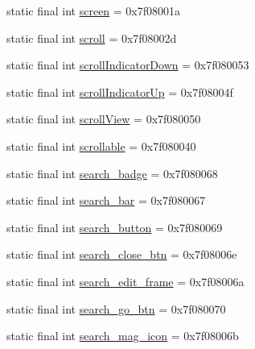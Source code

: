\begin{CompactItemize}
\item 
static final int \hyperlink{classandroid_1_1support_1_1graphics_1_1drawable_1_1animated_1_1_r_1_1id_f5e2617de658d6598044a4d8ce492a35}{screen} = 0x7f08001a
\item 
static final int \hyperlink{classandroid_1_1support_1_1graphics_1_1drawable_1_1animated_1_1_r_1_1id_c94d188d385ca6b8d43fc5bc312a021c}{scroll} = 0x7f08002d
\item 
static final int \hyperlink{classandroid_1_1support_1_1graphics_1_1drawable_1_1animated_1_1_r_1_1id_0b10a10fbbf226781332d85fe6af6236}{scrollIndicatorDown} = 0x7f080053
\item 
static final int \hyperlink{classandroid_1_1support_1_1graphics_1_1drawable_1_1animated_1_1_r_1_1id_0c537fe8c386d9dee31058e690527582}{scrollIndicatorUp} = 0x7f08004f
\item 
static final int \hyperlink{classandroid_1_1support_1_1graphics_1_1drawable_1_1animated_1_1_r_1_1id_3a0926b43068dcb6b2867953e0b8a053}{scrollView} = 0x7f080050
\item 
static final int \hyperlink{classandroid_1_1support_1_1graphics_1_1drawable_1_1animated_1_1_r_1_1id_5e96383f3794820387df2ae182bea221}{scrollable} = 0x7f080040
\item 
static final int \hyperlink{classandroid_1_1support_1_1graphics_1_1drawable_1_1animated_1_1_r_1_1id_76366c29d1c0d3ab87c6ba89d4c602a0}{search\_\-badge} = 0x7f080068
\item 
static final int \hyperlink{classandroid_1_1support_1_1graphics_1_1drawable_1_1animated_1_1_r_1_1id_944fb95e568c7a6007f4a3abdc4f3775}{search\_\-bar} = 0x7f080067
\item 
static final int \hyperlink{classandroid_1_1support_1_1graphics_1_1drawable_1_1animated_1_1_r_1_1id_3493151bde5e36d8cae5e65963f34da2}{search\_\-button} = 0x7f080069
\item 
static final int \hyperlink{classandroid_1_1support_1_1graphics_1_1drawable_1_1animated_1_1_r_1_1id_999b214efc2cf132328c9248bd34ecca}{search\_\-close\_\-btn} = 0x7f08006e
\item 
static final int \hyperlink{classandroid_1_1support_1_1graphics_1_1drawable_1_1animated_1_1_r_1_1id_a69cd9427a739c44f75f10c7fbe4258f}{search\_\-edit\_\-frame} = 0x7f08006a
\item 
static final int \hyperlink{classandroid_1_1support_1_1graphics_1_1drawable_1_1animated_1_1_r_1_1id_186033891ff2b2fa7553756b01c98b4a}{search\_\-go\_\-btn} = 0x7f080070
\item 
static final int \hyperlink{classandroid_1_1support_1_1graphics_1_1drawable_1_1animated_1_1_r_1_1id_9df229b231a2cbe52d8a0ac2d3d122d9}{search\_\-mag\_\-icon} = 0x7f08006b

\end{CompactItemize}
